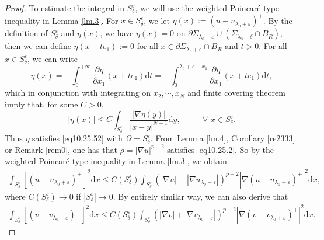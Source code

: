 \documentclass[12pt]{amsart}
\theoremstyle{definition}
\theoremstyle{remark}
\theoremstyle{conclusion}
\theoremstyle{conjecture}
\numberwithin{equation}{section}
\begin{document}
\begin{proof}
\smallskip

To estimate the integral in $S_\delta^\varepsilon$, we will use the weighted Poincar\'{e} type inequality in Lemma \ref{lm.3}. For $x\in S_\delta^\varepsilon$, we let $\eta(x):=(u-u_{\lambda_0+\varepsilon})^+$. By the definition of $S_\delta^\varepsilon$ and $\eta(x)$, we have $\eta(x)=0$ on $\partial\Sigma_{\lambda_0+\varepsilon} \cup (\Sigma_{\lambda_0-\delta}\cap B_R)$, then we can define $\eta(x+te_{1}):=0$ for all $x\in \partial\Sigma_{\lambda_0+\varepsilon}\cap B_{R}$ and $t>0$. For all $x\in S_\delta^\varepsilon$, we can write
$$ \eta(x)=-\int_{0}^{+\infty}\frac{\partial \eta}{\partial x_1}(x+te_{1}) \mathrm{d}t=-\int_{0}^{\lambda_0+\varepsilon-x_{1}}\frac{\partial \eta}{\partial x_1}(x+te_{1}) \mathrm{d}t,$$
which in conjunction with integrating on $x_{2},\cdots,x_{N}$ and finite covering theorem imply that, for some $C>0$,
$$ |\eta(x)|\leq C\int_{S_\delta^\varepsilon} \frac{|\nabla \eta(y)|}{|x-y|^{N-1}}\mathrm{d}y, \quad\quad \,\,\,\,\forall \,\, x\in S_\delta^\varepsilon.$$
Thus $\eta$ satisfies \eqref{eq10.25.52}  with $\Omega=S_\delta^\varepsilon$. From Lemma \ref{lm.4}, Corollary \ref{re2333} or Remark \ref{rem0}, one has that $\rho=|\nabla u|^{p-2}$ satisfies \eqref{eq10.25.2}. So by the weighted Poincar\'{e} type inequality in Lemma \ref{lm.3}, we obtain
\begin{align}\label{eq1002}
\int_{S_\delta^\varepsilon} [(u-u_{\lambda_0+\varepsilon})^+]^2 \mathrm{d}x \leq C(S_\delta^\varepsilon) \int_{S_\delta^\varepsilon} (|\nabla u|+|\nabla u_{\lambda_0+\varepsilon}|)^{p-2} |\nabla(u-u_{\lambda_0+\varepsilon})^+|^2 \mathrm{d}x,
\end{align}
where $C(S_\delta^\varepsilon)\to 0$ if $|S_\delta^\varepsilon|\to 0$. By entirely similar way, we can also derive that
\begin{align}\label{eq1002'}
\int_{S_\delta^\varepsilon} [(v-v_{\lambda_0+\varepsilon})^+]^2 \mathrm{d}x \leq C(S_\delta^\varepsilon) \int_{S_\delta^\varepsilon} (|\nabla v|+|\nabla v_{\lambda_0+\varepsilon}|)^{p-2} |\nabla(v-v_{\lambda_0+\varepsilon})^+|^2 \mathrm{d}x.
\end{align}


\end{proof}
\end{document}
